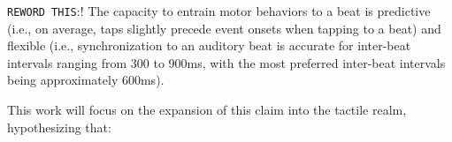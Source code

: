 \verb!REWORD THIS!:!
The capacity to entrain motor behaviors to a beat is predictive (i.e., on average, taps slightly precede event onsets when tapping to a beat) and flexible (i.e., synchronization to an auditory beat is accurate for inter-beat intervals ranging from 300 to 900ms, with the most preferred inter-beat intervals being approximately 600ms).~\cite{repp2013sensorimotor}

This work will focus on the expansion of this claim into the tactile realm, hypothesizing that:
